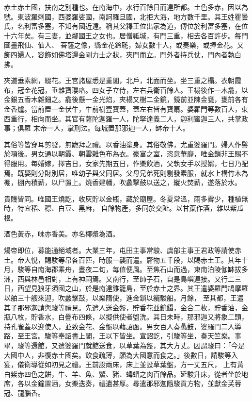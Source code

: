\begin{pinyinscope}
 赤土赤土國，扶南之別種也。在南海中，水行百餘日而達所都。土色多赤，因以為號。東波羅刺國，西婆羅娑國，南訶羅旦國，北拒大海，地方數千里。其王姓瞿曇氏，名利富多塞，不知有國近遠。稱其父釋王位出家為道，傳位於利富多塞，在位十六年矣。有三妻，並鄰國王之女也。居僧祗城，有門三重，相去各百許步。每門圖畫飛仙、仙人、
 菩薩之像，縣金花鈴毦，婦女數十人，或奏樂，或捧金花。又飾四婦人，容飾如佛塔邊金剛力士之狀，夾門而立。門外者持兵仗，門內者執白拂。



 夾道垂素網，綴花。王宮諸屋悉是重閣，北戶，北面而坐。坐三重之榻。衣朝霞布，冠金花冠，垂雜寶瓔珞。四女子立侍，左右兵衛百餘人。王榻後作一木龕，以金銀五香木雜鈿之。龕後懸一金光焰，夾榻又樹二金鏡，鏡前並陳金甕，甕前各有金香爐。當前置一金伏牛，牛前樹壹寶蓋，蓋左右皆有寶扇。婆羅門等數百人，東西重行，相向而坐。其官有薩陀迦羅一人，陀拏達義二人，迦利蜜迦三人，共掌政事；俱羅
 末帝一人，掌刑法。每城置那邪迦一人，缽帝十人。



 其俗等皆穿耳剪發，無跪拜之禮。以香油塗身。其俗敬佛，尤重婆羅門。婦人作髻於項後。男女通以朝霞、朝雲雜色布為衣。豪富之室，恣意華靡，唯金鎖非王賜不得服用。每婚嫁，擇吉日，女家先期五日，作樂飲酒，父執女手以授婿，七日乃配焉。既娶則分財別居，唯幼子與父同居。父母兄弟死則剔發素服，就水上構竹木為棚，棚內積薪，以尸置上。燒香建幡，吹蠡擊鼓以送之，縱火焚薪，遂落於水。



 貴賤皆同。唯國王燒訖，收灰貯以金瓶，藏於廟屋。冬夏常溫，雨多霽少，種植無時，特宜稻、穄、白豆、黑麻，
 自餘物產，多同於交阯。以甘蔗作酒，雜以紫瓜根。



 酒色黃赤，味亦香美。亦名椰漿為酒。



 煬帝即位，募能通絕域者。大業三年，屯田主事常駿、虞部主事王君政等請使赤土。帝大悅，賜駿等帛各百匹，時服一襲而遣。齎物五千段，以賜赤土王。其年十月，駿等自南海郡乘舟，晝夜二旬，每值便風。至焦石山而過，東南泊陵伽缽拔多洲，西與林邑相對，上有神祠焉。又南行，至師子石，自是島嶼連接。又行二三日，西望見狼牙須國之山，於是南達雞籠島，至於赤土之界。其王遣婆羅門鳩摩羅以舶三十艘來迎，吹蠡擊鼓，以樂隋使，進金鎖以纜駿船。月餘，
 至其都，王遣其子那邪迦請與駿等禮見。先遣人送金盤，貯香花並鏡鑷，金合二枚，貯香油，金瓶八枚，貯香水，白疊布四條，以擬供使者盥洗。其日未時，那邪迦又將象二頭，持孔雀蓋以迎使人，並致金花、金盤以藉詔函。男女百人奏蠡鼓，婆羅門二人導路，至王宮。駿等奉詔書上閣，王以下皆坐。宣詔訖，引駿等坐，奏天竺樂。事畢，駿等還館，又遣婆羅門就館送食，以草葉為盤，其大方丈。因謂駿曰：「今是大國中人，非復赤土國矣。飲食疏薄，願為大國意而食之。」後數日，請駿等入宴，儀衛導從如初見之禮。王前設兩床，床上並設草葉盤，方一丈五尺，
 上有黃白紫赤四色之餅，牛、羊、魚、鱉、豬、蝳蝐之肉百餘品。延駿升床，從者坐於地席，各以金鐘置酒，女樂迭奏，禮遺甚厚。尋遣那邪迦隨駿貢方物，並獻金芙蓉冠、龍腦香。




\end{pinyinscope}
